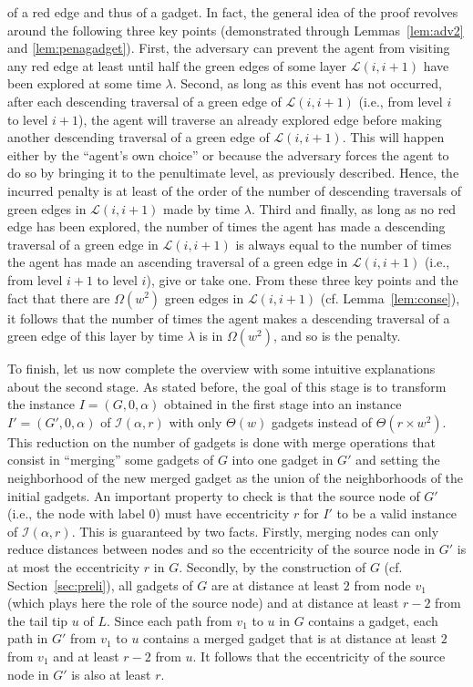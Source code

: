\documentclass[11pt]{article}
\begin{document}
of a red edge and thus of a gadget. In fact, the general idea of the proof revolves around the following three key points (demonstrated through Lemmas~\ref{lem:adv2} and \ref{lem:penagadget}). First, the adversary can prevent the agent from visiting any red edge at least until half the green edges of some layer $\mathcal{L}(i,i+1)$ have been explored at some time $\lambda$. Second, as long as this event has not occurred, after each descending traversal of a green edge of $\mathcal{L}(i,i+1)$ (i.e., from level $i$ to level $i+1$), the agent will traverse an already explored edge before making another descending traversal of a green edge of $\mathcal{L}(i,i+1)$. This will happen either by the ``agent's own choice'' or because the adversary forces the agent to do so by bringing it to the penultimate level, as previously described. Hence, the incurred penalty is at least of the order of the number of descending traversals of green edges in $\mathcal{L}(i,i+1)$ made by time $\lambda$. Third and finally, as long as no red edge has been explored, the number of times the agent has made a descending traversal of a green edge in $\mathcal{L}(i,i+1)$ is always equal
to the number of times the agent has made an ascending traversal of a
green edge in $\mathcal{L}(i,i+1)$ (i.e., from level $i+1$ to level
$i$), give or take one. From these three key points and the fact that
there are $\Omega(w^2)$ green edges in $\mathcal{L}(i,i+1)$
(cf. Lemma~\ref{lem:conse}), it follows that the number of times the
agent makes a descending traversal of a green edge of this layer by
time $\lambda$ is in $\Omega(w^2)$, and so is the penalty.

To finish, let us now complete the overview with some intuitive explanations about the second stage. As stated before, the goal of this stage is to transform the instance $I=(G,0, \alpha)$ obtained in the first stage into an instance $I'=(G',0, \alpha)$ of $\mathcal{I}(\alpha, r)$ with only $\Theta(w)$ gadgets instead of $\Theta(r\times w^2)$. This reduction on the number of gadgets is done with merge operations that consist in ``merging'' some gadgets of $G$ into one gadget in $G'$ and setting the neighborhood of the new merged gadget as the union of the neighborhoods of the initial gadgets. An important property to check is that the source node of $G'$ (i.e., the node with label $0$) must have eccentricity $r$ for $I'$ to be a valid instance of $\mathcal{I}(\alpha, r)$. This is guaranteed by two facts. Firstly, merging nodes can only reduce distances between nodes and so the eccentricity of the source node in $G'$ is at most the eccentricity $r$ in $G$. Secondly, by the construction of $G$ (cf. Section~\ref{sec:preli}), all gadgets of $G$ are at distance at least $2$ from node $v_1$ (which plays here the role of the source node) and at distance at least $r-2$ from the tail tip $u$ of $L$. Since each path from $v_1$ to $u$ in $G$ contains a gadget, each path in $G'$ from $v_1$ to $u$ contains a merged gadget that is at distance at least $2$ from $v_1$ and at least $r-2$ from $u$. It follows that the eccentricity of the source node in $G'$ is also at least $r$.
\end{document}
